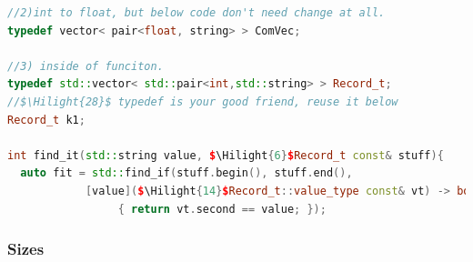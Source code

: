 \documentclass[a4paper,11pt,twoside]{book}
\newcommand{\Hilight}[1]{\makebox[0pt][l]{\color{yellow}\rule[-3pt]{#1em}{11pt}}}
\newcommand{\Hilight}[1]{}
\begin{document}
\begin{itemize}
\begin{lstlisting}[frame=single, language=c++, mathescape=true]
//2)int to float, but below code don't need change at all.
typedef vector< pair<float, string> > ComVec;

//3) inside of funciton.
typedef std::vector< std::pair<int,std::string> > Record_t;
//$\Hilight{28}$ typedef is your good friend, reuse it below
Record_t k1;

int find_it(std::string value, $\Hilight{6}$Record_t const& stuff){
  auto fit = std::find_if(stuff.begin(), stuff.end(),
            [value]($\Hilight{14}$Record_t::value_type const& vt) -> bool
                 { return vt.second == value; });
\end{lstlisting}

\end{itemize}


\subsubsection{Sizes}
\end{document}
